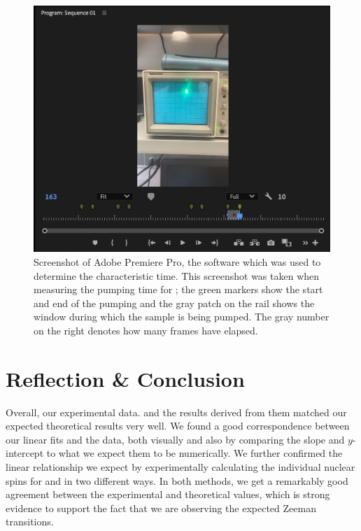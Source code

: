 \documentclass[10pt]{article}
\begin{document}
	\begin{figure}
		\centering
		\includegraphics[scale=0.5]{images/video-editor.png}
		\caption{Screenshot of Adobe Premiere Pro, the software which was used to
			determine the characteristic time. This screenshot was taken when
			measuring the pumping time for ; the green markers show the
			start and end of the pumping and the gray patch on the rail shows the
			window during which the sample is being pumped. The gray number on the
			right denotes how many frames have elapsed.}  
			\label{video-editor}
	\end{figure}	

	\section{Reflection \& Conclusion}

	Overall, our experimental data. and the results derived from them matched our
	expected theoretical results very well. We found a good correspondence between
	our linear fits and the data, both visually and also by comparing the slope and
	\( y \)-intercept to what we expect them to be numerically. We further confirmed
	the linear relationship we expect by experimentally calculating the individual
	nuclear spins for  and  in two different ways. In both
	methods, we get a remarkably good agreement between the experimental and
	theoretical values, which is strong evidence to support the fact that we are
	observing the expected Zeeman transitions.
\end{document}
